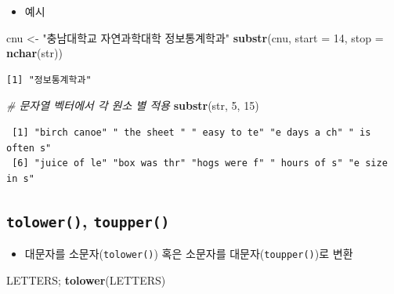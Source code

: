 \documentclass[
  11pt,
]{krantz}
\newenvironment{Shaded}{\begin{snugshade}}{\end{snugshade}}
\newcommand{\CommentTok}[1]{\textcolor[rgb]{0.37,0.37,0.37}{\textit{#1}}}
\newcommand{\DataTypeTok}[1]{\textcolor[rgb]{0.27,0.27,0.27}{#1}}
\newcommand{\DecValTok}[1]{\textcolor[rgb]{0.06,0.06,0.06}{#1}}
\newcommand{\KeywordTok}[1]{\textcolor[rgb]{0.27,0.27,0.27}{\textbf{#1}}}
\newcommand{\NormalTok}[1]{#1}
\newcommand{\StringTok}[1]{\textcolor[rgb]{0.5,0.5,0.5}{#1}}
\providecommand{\tightlist}{%
  \setlength{\itemsep}{0pt}\setlength{\parskip}{0pt}}
\begin{document}
\normalsize

\begin{itemize}
\tightlist
\item
  예시
\end{itemize}

\footnotesize

\begin{Shaded}
\begin{Highlighting}[]
\NormalTok{cnu <-}\StringTok{ "충남대학교 자연과학대학 정보통계학과"}
\KeywordTok{substr}\NormalTok{(cnu, }\DataTypeTok{start =} \DecValTok{14}\NormalTok{, }\DataTypeTok{stop =} \KeywordTok{nchar}\NormalTok{(str))}
\end{Highlighting}
\end{Shaded}

\begin{verbatim}
[1] "정보통계학과"
\end{verbatim}

\begin{Shaded}
\begin{Highlighting}[]
\CommentTok{# 문자열 벡터에서 각 원소 별 적용}
\KeywordTok{substr}\NormalTok{(str, }\DecValTok{5}\NormalTok{, }\DecValTok{15}\NormalTok{)}
\end{Highlighting}
\end{Shaded}

\begin{verbatim}
 [1] "birch canoe" " the sheet " " easy to te" "e days a ch" " is often s"
 [6] "juice of le" "box was thr" "hogs were f" " hours of s" "e size in s"
\end{verbatim}

\normalsize

\hypertarget{low-up-fun}{%
\subsection{\texorpdfstring{\textbf{\texttt{tolower()}, \texttt{toupper()}}}{tolower(), toupper()}}\label{low-up-fun}}

\begin{itemize}
\tightlist
\item
  대문자를 소문자(\texttt{tolower()}) 혹은 소문자를 대문자(\texttt{toupper()})로 변환
\end{itemize}

\footnotesize

\begin{Shaded}
\begin{Highlighting}[]
\NormalTok{LETTERS; }\KeywordTok{tolower}\NormalTok{(LETTERS)}
\end{Highlighting}
\end{Shaded}
\end{document}
